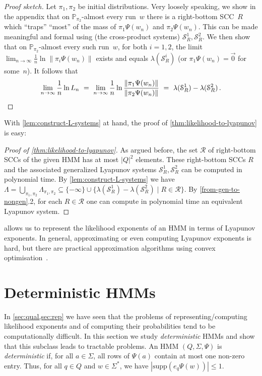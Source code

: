 \documentclass[a4paper,UKenglish,cleveref, autoref,mathscr]{lipics-v2019}
\newcommand{\PP}{\mathbb{P}}
\newcommand{\1}{\mathbbm{1}}
\newcommand{\supp}{\mathrm{supp}}
\newcommand{\liexp}{\lim_{n\rightarrow\infty} \frac1n \ln L_n}
\renewcommand{\H}{\mathcal{H}}
\renewcommand{\S}{\mathcal{S}}
\begin{document}
\begin{proof}[Proof sketch]
Let $\pi_1, \pi_2$ be initial distributions.
Very loosely speaking, we show in the appendix that on $\PP_{\pi_2}$-almost every run~$w$ there is a right-bottom SCC~$R$ which ``traps'' ``most'' of the mass of $\pi_1 \Psi(w_n)$ and $\pi_2 \Psi(w_n)$.
This can be made meaningful and formal using (the cross-product systems) $\S_R^1, \S_R^2$.
We then show that on $\PP_{\pi_2}$-almost every such run~$w$, for both $i=1,2$, the limit $\lim_{n \to \infty} \frac{1}{n} \ln \| \pi_i \Psi(w_n) \|$ exists and equals $\lambda(\S_R^i)$ (or $\pi_1 \Psi(w_n) = \vec{0}$ for some~$n$).
It follows that
\[
 \liexp \ = \ \lim_{n \to \infty} \frac{1}{n} \ln \frac{\| \pi_1 \Psi(w_n) \|}{\| \pi_2 \Psi(w_n) \|} \ = \ \lambda(\S_R^1) - \lambda(\S_R^2) \,. \qedhere
\]
\end{proof}
With \cref{lem:construct-L-systems} at hand, the proof of \cref{thm:likelihood-to-lyapunov} is easy:
\begin{proof}[Proof of \cref{thm:likelihood-to-lyapunov}]
As argued before, the set $\mathcal{R}$ of right-bottom SCCs of the given HMM has at most $|Q|^2$ elements.
These right-bottom SCCs $R$ and the associated generalized Lyapunov systems $\S_R^1, \S_R^2$ can be computed in polynomial time.
By \cref{lem:construct-L-systems} we have $\Lambda = \bigcup_{\pi_1,\pi_2} \Lambda_{\pi_1,\pi_2} \subseteq \{-\infty\} \cup \{\lambda(\S_{R}^1) - \lambda(\S_{R}^2) \mid R \in \mathcal{R}\}$.
By \cref{from-gen-to-nongen}.2, for each $R \in \mathcal{R}$ one can compute in polynomial time an equivalent Lyapunov system.
\end{proof}

 allows us to represent the likelihood exponents of an HMM in terms of Lyapunov exponents.
In general, approximating or even computing Lyapunov exponents is hard, but there are practical approximation algorithms using convex optimisation~\cite{ProtasovJungers13,Sutter21}.

\section{Deterministic HMMs} \label{sec:det}

In \cref{sec:qual,sec:rep} we have seen that the problems of representing/computing likelihood exponents and of computing their probabilities tend to be computationally difficult.
In this section we study \emph{deterministic} HMMs and show that this subclass leads to tractable problems.
An HMM $(Q, \Sigma, \Psi)$ is \emph{deterministic} if, for all $a \in \Sigma$, all rows of $\Psi(a)$ contain at most one non-zero entry.
Thus, for all $q \in Q$ and $w \in \Sigma^*$, we have $|\supp(e_q \Psi(w))| \le 1$.
\end{document}
